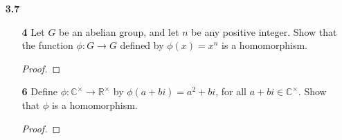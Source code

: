 \documentclass[paper=usletter, fontsize=12pt]{article}
\begin{document}
\begin{itemize}
\begin{itemize}
\begin{enumerate}[label=\textbf{(\alph*)}]
                \item What can you say about $A_n$ if $n>6$?
                \begin{proof}
                \end{proof}

            \end{enumerate}

            \item[\textbf{17}] For any elements $\sigma, \tau \in S_n$, show
            that $\sigma\tau\sigma^{-1}\tau^{-1}\in A_n$.
            \begin{proof}
            \end{proof}

            \item[\textbf{21}] Find the center of the dihedral group $D_n$. \\
            \textit{Hint:} Consider two cases, depending on whether $n$ is odd
            or even.
            \begin{proof}
            \end{proof}

            \item[\textbf{24}] Show that the product of two transpositions is
            one of (i) the identity; (ii) a 3-cycle; (iii) a product of two
            (nondisjoint) 3-cycles. Deduce that every element of $A_n$ can be
            written as a product of 3-cycles.
            \begin{proof}
            \end{proof}

        \end{itemize}

        \item[\textbf{3.7}]
        \begin{enumerate}

            \item[\textbf{4}] Let $G$ be an abelian group, and let $n$ be any
            positive integer. Show that the function $\phi: G \rightarrow G$
            defined by $\phi(x)=x^n$ is a homomorphism.
            \begin{proof}
            \end{proof}

            \item[\textbf{6}] Define $\phi:
            \mathbb{C}^{\times}\rightarrow\mathbb{R}^{\times}$ by
            $\phi(a+bi)=a^2+bi$, for all $a+bi\in \mathbb{C}^{\times}$. Show
            that $\phi$ is a homomorphism.
            \begin{proof}
            \end{proof}


\end{enumerate}
\end{itemize}
\end{document}
